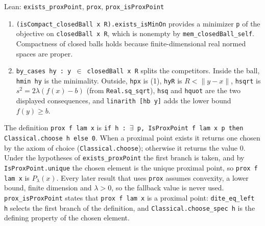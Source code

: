 \documentclass[11pt,a4paper]{article}
\begin{document}
\begin{leanbox}{Lean: \texttt{exists\_\allowbreak{}proxPoint}, \texttt{prox}, \texttt{prox\_\allowbreak{}isProxPoint}}
\begin{enumerate}
\item \texttt{(is\allowbreak{}Compact\_\allowbreak{}closed\allowbreak{}Ball x R).\allowbreak{}exists\_\allowbreak{}is\allowbreak{}Min\allowbreak{}On} provides a minimizer \texttt{p} of the objective on \texttt{closed\allowbreak{}Ball x R}, which is nonempty by \texttt{mem\_\allowbreak{}closed\allowbreak{}Ball\_\allowbreak{}self}. Compactness of closed balls holds because finite-dimensional real normed spaces are proper.

\item \texttt{by\_\allowbreak{}cases hy : y \ensuremath{\in} closed\allowbreak{}Ball x R} splits the competitors. Inside the ball, \texttt{hmin hy} is the minimality. Outside, \texttt{hpx} is (1), \texttt{hy\allowbreak{}R} is \(R<\|y-x\|\), \texttt{hsqrt} is \(s^2=2\lambda(f(x)-b)\) (from \texttt{Real.\allowbreak{}sq\_\allowbreak{}sqrt}), \texttt{hsq} and \texttt{hquot} are the two displayed consequences, and \texttt{linarith [hb y]} adds the lower bound \(f(y)\ge b\).

\end{enumerate}



The definition \texttt{prox f lam x} is \texttt{if h : \ensuremath{\exists} p, Is\allowbreak{}Prox\allowbreak{}Point f lam x p then Classical.\allowbreak{}choose h else 0}. When a proximal point exists it returns one chosen by the axiom of choice (\texttt{Classical.\allowbreak{}choose}); otherwise it returns the value \(0\). Under the hypotheses of \texttt{exists\_\allowbreak{}prox\allowbreak{}Point} the first branch is taken, and by \texttt{Is\allowbreak{}Prox\allowbreak{}Point.\allowbreak{}unique} the chosen element is the unique proximal point, so \texttt{prox f lam x} is \(P_\lambda(x)\). Every later result that uses \texttt{prox} assumes convexity, a lower bound, finite dimension and \(\lambda>0\), so the fallback value is never used. \texttt{prox\_\allowbreak{}is\allowbreak{}Prox\allowbreak{}Point} states that \texttt{prox f lam x} is a proximal point: \texttt{dite\_\allowbreak{}eq\_\allowbreak{}left h} selects the first branch of the definition, and \texttt{Classical.\allowbreak{}choose\_\allowbreak{}spec h} is the defining property of the chosen element.
\end{leanbox}
\end{document}
